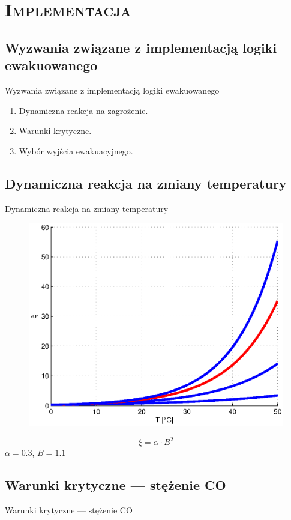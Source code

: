 \section{\scshape Implementacja}


\subsection{Wyzwania związane z implementacją logiki ewakuowanego}
\begin{frame}{Wyzwania związane z implementacją logiki ewakuowanego}
  \begin{enumerate}
    \item Dynamiczna reakcja na zagrożenie.
    \item Warunki krytyczne.
    \item Wybór wyjścia ewakuacyjnego.
  \end{enumerate}
\end{frame}


\subsection{Dynamiczna reakcja na zmiany temperatury}
\begin{frame}{Dynamiczna reakcja na zmiany temperatury}
  \begin{figure}
    \centering
    \includegraphics[height=0.6\textheight]{wykresy-kuba}
  \end{figure}
  $$\xi = \alpha \cdot B^2$$
  $\alpha = 0.3$, $B = 1.1$
\end{frame}


\subsection{Warunki krytyczne --- stężenie CO}
\begin{frame}{Warunki krytyczne --- stężenie CO}
\end{frame}